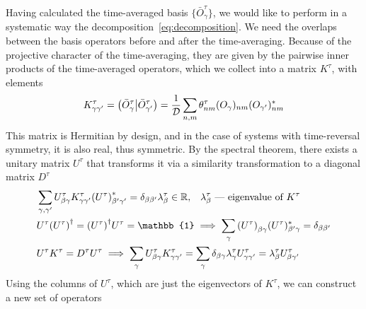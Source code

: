 Having calculated the time-averaged basis \( \{\bar{O}_{\gamma}^{\tau}\} \), we would like to perform in a
systematic way the decomposition~\ref{eq:decomposition}. We need the overlaps between the basis operators
before and after the time-averaging. Because of the projective character of the time-averaging, they are
given by the pairwise inner products of the time-averaged operators, which we collect into a matrix
\(K^{\tau}\), with elements
\begin{equation}
  K^{\tau}_{\gamma\gamma^{\prime}} = \left(\bar{O}_{\gamma}^{\tau} \middle| \bar{O}_{\gamma^{\prime}}^{\tau}\right) = \frac{1}{\mathcal{D}}\sum_{n,m} \theta_{nm}^{\tau} (O_{\gamma})_{nm} (O_{\gamma^{\prime}})_{nm}^{\ast}
  \label{eq:overlap_matrix}
\end{equation}
This matrix is Hermitian by design, and in the case of systems with time-reversal symmetry, it is also real,
thus symmetric. By the spectral theorem, there exists a unitary matrix \(U^{\tau}\) that transforms it
via a similarity transformation to a diagonal matrix \(D^{\tau}\)
\begin{align}
   & \sum_{\gamma,\gamma^{\prime}} U^{\tau}_{\beta \gamma} K_{\gamma\gamma^{\prime}}^{\tau} {(U^{\tau})}_{\beta^{\prime} \gamma^{\prime}}^{\ast}=\delta_{\beta\beta^{\prime}} \lambda^{\tau}_{\beta} \in
  \RR,\;\;\; \lambda_{\beta}^{\tau } \text{ --- eigenvalue of }K^{\tau} \label{eq:property diag}                                                                                                                                                                                                     \\
   & U^{\tau}{(U^{\tau})}^{\dag} = {(U^{\tau})}^{\dag}U^{\tau} = \mathbb{1} \implies \sum_{\gamma} {(U^{\tau})}_{\beta\gamma}(U^{\tau})_{\beta^{\prime}\gamma}^{\ast} =
  \delta_{\beta\beta^{\prime}} \label{eq:propery_ortho}                                                                                                                                                                                                                                              \\
   & U^{\tau} K^{\tau} = D^{\tau} U^{\tau} \implies \sum_{\gamma} U^{\tau}_{\beta\gamma} K_{\gamma\gamma^{\prime}}^{\tau} = \sum_{\gamma}  \delta_{\beta\gamma} \lambda^{\tau}_{\gamma} U^{\tau}_{\gamma\gamma^{\prime}} = \lambda^{\tau}_{\beta} U^{\tau}_{\beta\gamma^{\prime}}\label{eq:property}
\end{align}
Using the columns of \(U^{\tau}\), which are just the eigenvectors of \(K^{\tau}\), we can construct a new set of operators
